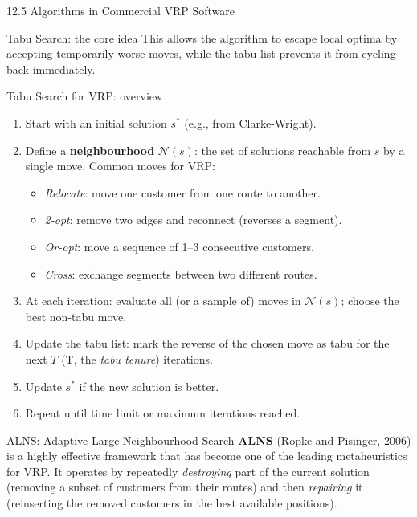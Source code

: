 \documentclass[aspectratio=169,10pt]{beamer}
\begin{document}
\begin{frame}[allowframebreaks]{12.5 \; Algorithms in Commercial VRP Software}
\begin{block}{Tabu Search: the core idea}
    This allows the algorithm to escape local optima by accepting temporarily
    worse moves, while the tabu list prevents it from cycling back immediately.
  \end{block}

  \begin{block}{Tabu Search for VRP: overview}
    \begin{enumerate}
      \item Start with an initial solution $s^*$ (e.g., from Clarke-Wright).
      \item Define a \textbf{neighbourhood} $\mathcal{N}(s)$: the set of
            solutions reachable from $s$ by a single move.
            Common moves for VRP:
            \begin{itemize}
              \item \emph{Relocate}: move one customer from one route to another.
              \item \emph{2-opt}: remove two edges and reconnect (reverses a segment).
              \item \emph{Or-opt}: move a sequence of 1--3 consecutive customers.
              \item \emph{Cross}: exchange segments between two different routes.
            \end{itemize}
      \item At each iteration: evaluate all (or a sample of) moves in
            $\mathcal{N}(s)$; choose the best non-tabu move.
      \item Update the tabu list: mark the reverse of the chosen move as
            tabu for the next $T$ (T, the \emph{tabu tenure}) iterations.
      \item Update $s^*$ if the new solution is better.
      \item Repeat until time limit or maximum iterations reached.
    \end{enumerate}
  \end{block}

  \framebreak

  \begin{block}{ALNS: Adaptive Large Neighbourhood Search}
    \textbf{ALNS} (Ropke and Pisinger, 2006) is a highly effective framework
    that has become one of the leading metaheuristics for VRP.
    It operates by repeatedly \emph{destroying} part of the current solution
    (removing a subset of customers from their routes) and then
    \emph{repairing} it (reinserting the removed customers in the
    best available positions).


\end{block}
\end{frame}
\end{document}

